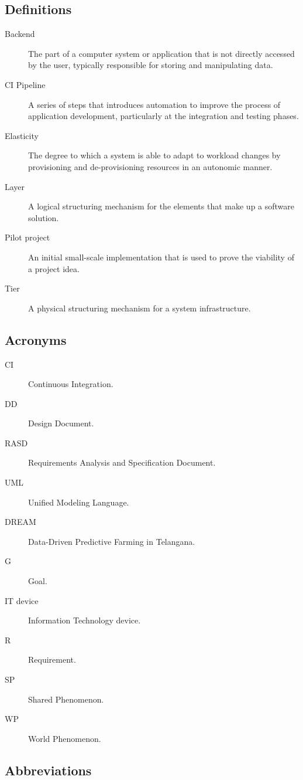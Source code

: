 \documentclass[../../main.tex]{subfiles}
\begin{document}
\subsection{Definitions}

\begin{description}

    \item[Backend] The part of a computer system or application that 
    is not directly accessed by the user, typically responsible for 
    storing and manipulating data.

    \item[CI Pipeline] A series of steps that introduces automation to improve the process of 
    application development, particularly at the integration and testing phases.
     
    \item[Elasticity] The degree to which a system is able to adapt to workload changes by provisioning and de-provisioning resources in an autonomic manner.

    \item[Layer] A logical structuring mechanism for the elements that make up a software solution.

 
    \item[Pilot project] An initial small-scale implementation that is used to 
    prove the viability of a project idea.

    \item[Tier] A physical structuring mechanism for a system infrastructure.
    
\end{description}

\subsection{Acronyms}

\begin{description}

    \item[CI] Continuous Integration.

    \item[DD] Design Document.
    
    \item[RASD] Requirements Analysis and Specification Document.
    
    \item[UML] Unified Modeling Language.
    
    \item[DREAM] Data-Driven Predictive Farming in Telangana.
    
    \item[G] Goal.
    
    \item[IT device] Information Technology device.
    
    \item[R] Requirement.
    
    \item[SP] Shared Phenomenon.
    
    \item[WP] World Phenomenon.

\end{description}

\subsection{Abbreviations}
\end{document}
